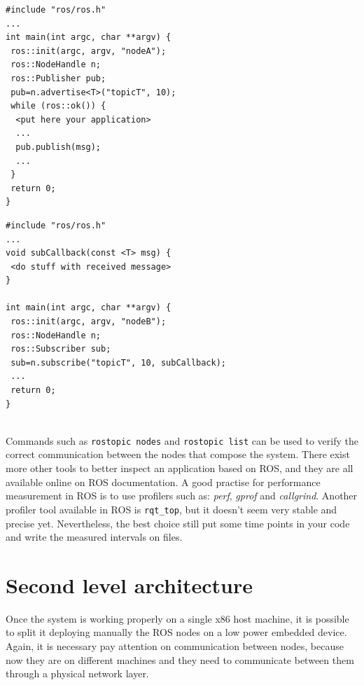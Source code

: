 \noindent\begin{minipage}{.48\textwidth}
\begin{verbatim}
#include "ros/ros.h"
...
int main(int argc, char **argv) {
 ros::init(argc, argv, "nodeA");
 ros::NodeHandle n;
 ros::Publisher pub;
 pub=n.advertise<T>("topicT", 10);
 while (ros::ok()) {
  <put here your application>
  ...
  pub.publish(msg);
  ...
 }
 return 0;
}
\end{verbatim}
\label{lst:pub}
\end{minipage}\hfill
\begin{minipage}{.48\textwidth}
\begin{verbatim}
#include "ros/ros.h"
...
void subCallback(const <T> msg) {
 <do stuff with received message>
}

int main(int argc, char **argv) {
 ros::init(argc, argv, "nodeB");
 ros::NodeHandle n;
 ros::Subscriber sub;
 sub=n.subscribe("topicT", 10, subCallback);
 ...
 return 0;
}
\end{verbatim}
\label{lst:sub}
\end{minipage}
\\


Commands such as \texttt{rostopic nodes} and \texttt{rostopic list} can be used to verify the correct communication between the nodes that compose the system.
There exist more other tools to better inspect an application based on ROS, and they are all available online on ROS documentation.
A good practise for performance measurement in ROS is to use profilers such as: \textit{perf}, \textit{gprof} and \textit{callgrind}. Another profiler tool available in ROS is \texttt{rqt_top}, but it doesn't seem very stable and precise yet. Nevertheless, the best choice still put some time points in your code and write the measured intervals on files.



\section{Second level architecture}
Once the system is working properly on a single x86 host machine, it is possible to split it deploying manually the ROS nodes on a low power embedded device.
Again, it is necessary pay attention on communication between nodes, because now they are on different machines and they need to communicate between them through a physical network layer.

